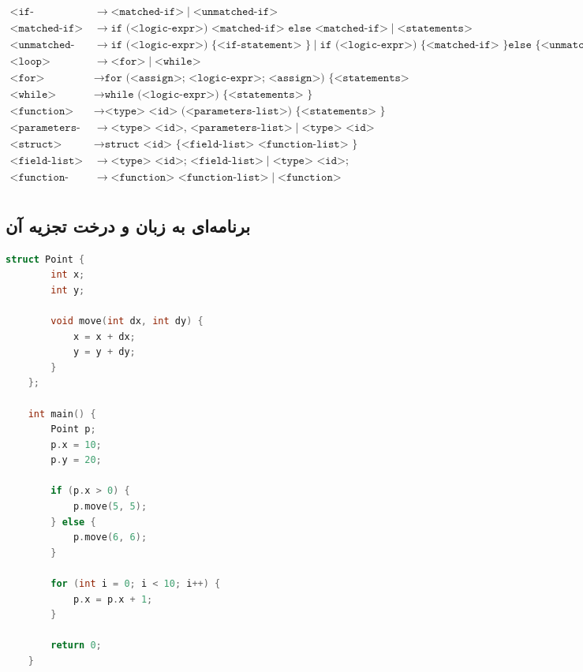 \documentclass[12pt, a4paper]{report}
\begin{document}
\begin{align*}
	\texttt{<if-statement>} &\rightarrow \texttt{<matched-if>} \mid \texttt{<unmatched-if>} \\
	\texttt{<matched-if>} &\rightarrow \texttt{if (<logic-expr>) <matched-if> else <matched-if>} \mid \texttt{<statements>} \\
	\texttt{<unmatched-if>} &\rightarrow \texttt{if (<logic-expr>) \{ <if-statement> \}} \mid \texttt{if (<logic-expr>) \{ <matched-if> \} else \{ <unmatched-if> \}} \mid \texttt{\{ <statements> \}} \\
	\texttt{<loop>} &\rightarrow \texttt{<for>} \mid \texttt{<while>} \\
	\texttt{<for>} &\rightarrow \texttt{for (<assign>; <logic-expr>; <assign>) \{ <statements> \}} \\
	\texttt{<while>} &\rightarrow \texttt{while (<logic-expr>) \{ <statements> \}} \\
	\texttt{<function>} &\rightarrow \texttt{<type> <id> (<parameters-list>) \{ <statements> \}} \\
	\texttt{<parameters-list>} &\rightarrow \texttt{<type> <id>, <parameters-list>} \mid \texttt{<type> <id>} \\
	\texttt{<struct>} &\rightarrow \texttt{struct <id> \{ <field-list> <function-list> \}} \\
	\texttt{<field-list>} &\rightarrow \texttt{<type> <id>; <field-list>} \mid \texttt{<type> <id>; } \\
	\texttt{<function-list>} &\rightarrow \texttt{<function> <function-list>} \mid \texttt{<function>} \\
\end{align*}
\subsection{برنامه‌ای به زبان  و درخت تجزیه آن}
\LTR
\begin{lstlisting}[language=C++]
	struct Point {
		int x;
		int y;
		
		void move(int dx, int dy) {
			x = x + dx;
			y = y + dy;
		}
	};
	
	int main() {
		Point p;
		p.x = 10;
		p.y = 20;
		
		if (p.x > 0) {
			p.move(5, 5);
		} else {
			p.move(6, 6);
		}
		
		for (int i = 0; i < 10; i++) {
			p.x = p.x + 1;
		}
		
		return 0;
	}
\end{lstlisting}
\RTL
\end{document}
